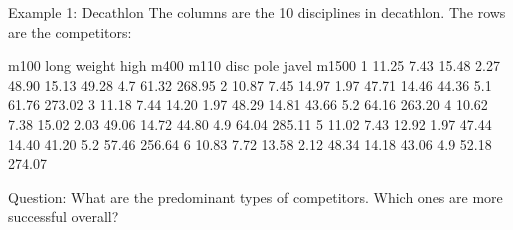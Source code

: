 \documentclass[11pt,handout,aspectratio=169]{beamer}
\begin{document}
\begin{frame}[fragile]{Example 1: Decathlon}
The columns are the 10 disciplines in decathlon. The rows are the competitors:
{\scriptsize
\begin{Schunk}
\begin{Soutput}
   m100 long weight high  m400  m110  disc pole javel  m1500
1 11.25 7.43  15.48 2.27 48.90 15.13 49.28  4.7 61.32 268.95
2 10.87 7.45  14.97 1.97 47.71 14.46 44.36  5.1 61.76 273.02
3 11.18 7.44  14.20 1.97 48.29 14.81 43.66  5.2 64.16 263.20
4 10.62 7.38  15.02 2.03 49.06 14.72 44.80  4.9 64.04 285.11
5 11.02 7.43  12.92 1.97 47.44 14.40 41.20  5.2 57.46 256.64
6 10.83 7.72  13.58 2.12 48.34 14.18 43.06  4.9 52.18 274.07
\end{Soutput}
\end{Schunk}}
Question: What are the predominant types of competitors. Which ones are more successful overall?
\end{frame}


\end{document}
